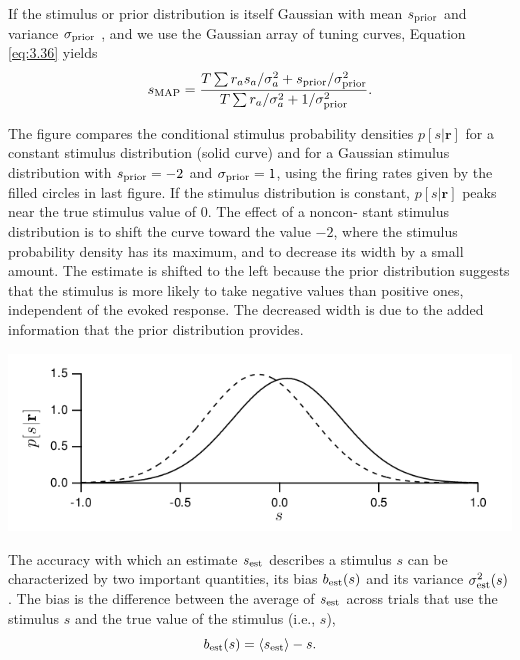 \begin{exm}
  If the stimulus or prior distribution is itself Gaussian with mean
  $s_{\rm{prior}}$  and
variance  $\sigma_{\rm{prior}}$ , and we use the Gaussian array of tuning curves,
Equation \ref{eq:3.36} yields
\begin{equation}
  \label{eq:3.37}
s_{\rm{MAP}}=\frac{T\sum{r_as_a}/\sigma_a^{2}+s_{\rm{prior}}/\sigma_{{\rm{prior}}}^{2}}{T\sum{r_a/\sigma_a^{2}}+1/\sigma_{{\rm{prior}}}^{2}}.
\end{equation}
\end{exm}

\begin{exm}
  The figure compares the conditional stimulus probability densities $p[s|\mathbf{r}]$
for a constant stimulus distribution (solid curve) and for a Gaussian stimulus distribution with $s_{\rm{prior}}=-2$ and $\sigma_{{\rm{prior}}}=1$, using the firing rates given
by the filled circles in last figure. If the stimulus distribution is constant,
$p[s|\mathbf{r}]$ peaks near the true stimulus value of $0$. The effect of a noncon-
stant stimulus distribution is to shift the curve toward the value $-2$, where
the stimulus probability density has its maximum, and to decrease its
width by a small amount. The estimate is shifted to the left because the
prior distribution suggests that the stimulus is more likely to take
negative values than positive ones, independent of the evoked
response. The decreased width is due to the added information that the prior distribution provides.

\begin{center}
    \label{fig:3-10}
  \includegraphics[scale = 0.4]{./png/3-10}
\end{center}
\end{exm}


\begin{defn}
  \label{defn:bias}
  The accuracy with which an estimate $s_{\rm{est}}$ describes a
  stimulus $s$ can be characterized by two important quantities, its
  bias $b_{\rm{est}}(s)$ and its variance
$\sigma_{\rm{est}}^{2}(s)$. The bias is the difference between the
average of $s_{\rm{est}}$ across trials that use the stimulus $s$ and the true
value of the stimulus (i.e., $s$),
\begin{equation}
  \label{eq:3.38}
  b_{\rm{est}}(s)=\left\langle s_{\rm{est}} \right\rangle-s.
\end{equation}
\end{defn}


